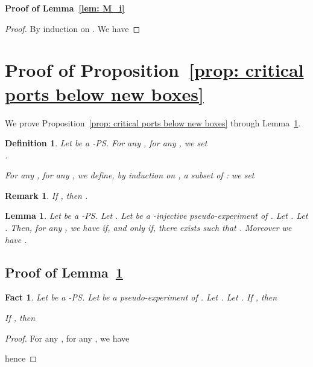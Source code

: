 \documentclass{article}
\theoremstyle{plain}
\newtheorem{definition}{Definition}
\newtheorem{lem}[theorem]{Lemma}
\newtheorem{fact}[theorem]{Fact}
\newtheorem{rem}{Remark}
\begin{document}
\textbf{Proof of Lemma~\ref{lem: M_i}}

\begin{proof}
By induction on . We have

\end{proof}



\section{Proof of Proposition~\ref{prop: critical ports below new boxes}}


We prove Proposition~\ref{prop: critical ports below new boxes} through Lemma~\ref{lem: arity{taylor{e}{i}}(c) for c at depth 0}. 


\begin{definition}
Let  be a -PS. 
For any , for any , we set 
\\
. 



For any , for any , we define, by induction on , a subset  of : we set 

\end{definition}

\begin{rem}
If ,  then  .
\end{rem}


\begin{lem}\label{lem: arity{taylor{e}{i}}(c) for c at depth 0}
Let  be a -PS. Let . Let  be a -injective pseudo-experiment of . Let . Let . Then, for any , we have  if, and only if, there exists  such that . Moreover we have .
\end{lem}

\subsection{Proof of Lemma~\ref{lem: arity{taylor{e}{i}}(c) for c at depth 0}}

\begin{fact}\label{fact: arity}
Let  be a -PS. Let  be a pseudo-experiment of . Let . Let . 
If , then

If , then

\end{fact}

\begin{proof}
For any , for any , we have

hence

\end{proof}
\end{document}
